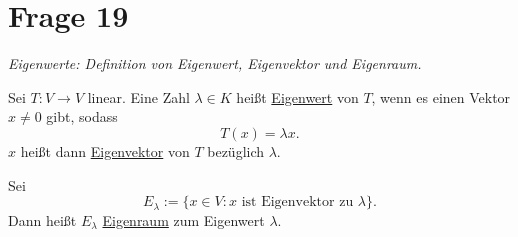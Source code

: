 \section{Frage 19}
\textit{Eigenwerte: Definition von Eigenwert, Eigenvektor und Eigenraum.}
\begin{definition}
     Sei $T:V\to V$ linear. Eine Zahl $\lambda \in K$ heißt \underline{Eigenwert} von $T$,
    wenn es einen Vektor $x\neq 0$ gibt, sodass
    \[
        T(x) = \lambda x.
    \]
    $x$ heißt dann \underline{Eigenvektor} von $T$ bezüglich $\lambda$.
\end{definition}
\begin{definition}
    [Eigenraum] Sei 
    \[
        E_\lambda := \{x\in V : x \text{ ist Eigenvektor zu }\lambda\}.
    \]
    Dann heißt $E_\lambda$ \underline{Eigenraum} zum Eigenwert $\lambda$.
\end{definition}